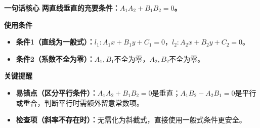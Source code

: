 \begin{summarybox}
	\textbf{\textcolor{CSummary}{一句话核心}}
	\textbf{两直线垂直的充要条件：$A_1A_2+B_1B_2=0$。}

	\medskip
	\textbf{\textcolor{CSummary}{使用条件}}
	\begin{itemize}[leftmargin=*, itemsep=0.5em, topsep=0.4em]
		\item \textbf{条件1（直线为一般式）：}$l_1:A_1x+B_1y+C_1=0$，$l_2:A_2x+B_2y+C_2=0$。
		\item \textbf{条件2（系数不全为零）：}$A_1,B_1$不全为零，$A_2,B_2$不全为零。
	\end{itemize}

	\medskip
	\textbf{\textcolor{CSummary}{关键提醒}}
	\begin{itemize}[leftmargin=*, itemsep=0.5em, topsep=0.4em]
		\item \textbf{易错点（区分平行条件）：}$A_1A_2+B_1B_2=0$是垂直；$A_1B_2-A_2B_1=0$是平行或重合，判断平行时需额外留意常数项。
		\item \textbf{检查项（斜率不存在时）：}无需化为斜截式，直接使用一般式条件更安全。
	\end{itemize}

\end{summarybox}
